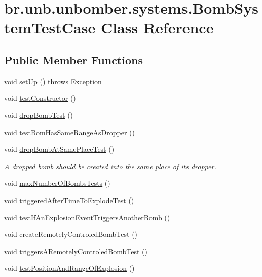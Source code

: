 \hypertarget{classbr_1_1unb_1_1unbomber_1_1systems_1_1_bomb_system_test_case}{\section{br.\+unb.\+unbomber.\+systems.\+Bomb\+System\+Test\+Case Class Reference}
\label{classbr_1_1unb_1_1unbomber_1_1systems_1_1_bomb_system_test_case}
}
\subsection*{Public Member Functions}
\begin{DoxyCompactItemize}
\item 
void \hyperlink{classbr_1_1unb_1_1unbomber_1_1systems_1_1_bomb_system_test_case_a3e32945dff919d9395eb0f97d4513863}{set\+Up} ()  throws Exception 
\item 
void \hyperlink{classbr_1_1unb_1_1unbomber_1_1systems_1_1_bomb_system_test_case_aee8e84898d06603c217bce292da25b52}{test\+Constructor} ()
\item 
void \hyperlink{classbr_1_1unb_1_1unbomber_1_1systems_1_1_bomb_system_test_case_aa4d3b1ba7711e42973dff2a7c6f26c83}{drop\+Bomb\+Test} ()
\item 
void \hyperlink{classbr_1_1unb_1_1unbomber_1_1systems_1_1_bomb_system_test_case_a32cfa477841384686c1b2229a35637e7}{test\+Bom\+Has\+Same\+Range\+As\+Dropper} ()
\item 
void \hyperlink{classbr_1_1unb_1_1unbomber_1_1systems_1_1_bomb_system_test_case_a63c061f6a4d63b772cc73ecf60f4209f}{drop\+Bomb\+At\+Same\+Place\+Test} ()
\begin{DoxyCompactList}\small\item\em A dropped bomb should be created into the same place of its dropper. \end{DoxyCompactList}\item 
void \hyperlink{classbr_1_1unb_1_1unbomber_1_1systems_1_1_bomb_system_test_case_a06949299851338adb3ce38af1551c065}{max\+Number\+Of\+Bombs\+Tests} ()
\item 
void \hyperlink{classbr_1_1unb_1_1unbomber_1_1systems_1_1_bomb_system_test_case_afc3c21e0f32a96f21d45bc5b0ccb4ee2}{triggered\+After\+Time\+To\+Explode\+Test} ()
\item 
void \hyperlink{classbr_1_1unb_1_1unbomber_1_1systems_1_1_bomb_system_test_case_a1453b7b0ace81d7ea7c04d1b994f5022}{test\+If\+An\+Explosion\+Event\+Triggers\+Another\+Bomb} ()
\item 
void \hyperlink{classbr_1_1unb_1_1unbomber_1_1systems_1_1_bomb_system_test_case_aab2e40333f4bf262553a7aaf3edd226c}{create\+Remotely\+Controled\+Bomb\+Test} ()
\item 
void \hyperlink{classbr_1_1unb_1_1unbomber_1_1systems_1_1_bomb_system_test_case_aa95a8f7ed01e762f9b42891b1ff0ab0a}{triggers\+A\+Remotely\+Controled\+Bomb\+Test} ()
\item 
void \hyperlink{classbr_1_1unb_1_1unbomber_1_1systems_1_1_bomb_system_test_case_aca6b0fccec0022c50191b1c3fe077097}{test\+Position\+And\+Range\+Of\+Explosion} ()
\end{DoxyCompactItemize}
